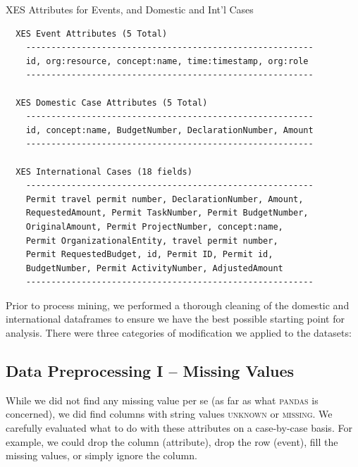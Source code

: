 \documentclass[conference]{IEEEtran}
\begin{document}
\begin{table}[htbp]
\caption{XES Attributes for Events, and Domestic and Int'l Cases}
\vspace{-1em}
\begin{center}
\begin{verbatim}
  XES Event Attributes (5 Total)
    ---------------------------------------------------------
    id, org:resource, concept:name, time:timestamp, org:role
    ---------------------------------------------------------

  XES Domestic Case Attributes (5 Total)
    ---------------------------------------------------------
    id, concept:name, BudgetNumber, DeclarationNumber, Amount
    ---------------------------------------------------------

  XES International Cases (18 fields)
    ---------------------------------------------------------
    Permit travel permit number, DeclarationNumber, Amount,
    RequestedAmount, Permit TaskNumber, Permit BudgetNumber,
    OriginalAmount, Permit ProjectNumber, concept:name,
    Permit OrganizationalEntity, travel permit number,
    Permit RequestedBudget, id, Permit ID, Permit id,
    BudgetNumber, Permit ActivityNumber, AdjustedAmount        
    ---------------------------------------------------------
\end{verbatim}
\end{center}
\vspace{-1em}
\label{table-event}
\end{table}



Prior to process mining, we performed a thorough cleaning of the
domestic and international dataframes to ensure we have
the best possible starting
point for analysis. There were three categories of modification we applied
to the datasets:

\subsection{Data Preprocessing I -- Missing Values}

While we did not find any missing value per se (as far
as what \textsc{pandas} is concerned), we did find columns with string values
\textsc{unknown} or \textsc{missing}. We
carefully evaluated what to do with these attributes on a case-by-case
basis. For example, we could drop the column (attribute), drop the row
(event), fill the missing values, or simply ignore the column.
\end{document}
